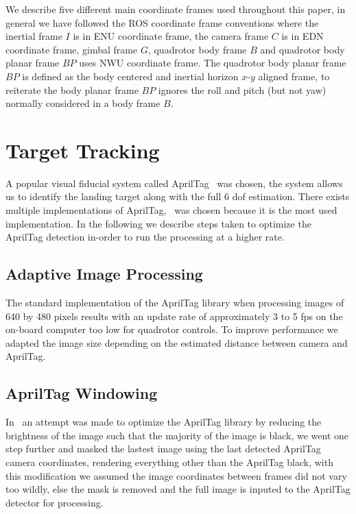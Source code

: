 \documentclass[letterpaper, 10 pt, conference]{ieeeconf}
\begin{document}
We describe five different main coordinate frames used throughout this
paper, in general we have followed the ROS coordinate frame conventions
where the inertial frame $I$ is in ENU coordinate frame, the camera frame
$C$ is in EDN coordinate frame, gimbal frame $G$, quadrotor body frame $B$ and
quadrotor body planar frame $BP$ uses NWU coordinate frame. The quadrotor body
planar frame $BP$ is defined as the body centered and inertial horizon $x$-$y$
aligned frame, to reiterate the body planar frame $BP$ ignores the roll and
pitch (but not yaw) normally considered in a body frame $B$.



\section{Target Tracking}
A popular visual fiducial system called AprilTag~\cite{Olson2011} was chosen,
the system allows us to identify the landing target along with the full 6 dof
estimation. There exists multiple implementations of
AprilTag,~\cite{AprilTagMIT} was chosen because it is the most used
implementation. In the following we describe steps taken to optimize the
AprilTag detection in-order to run the processing at a higher rate.


\subsection{Adaptive Image Processing}
The standard implementation of the AprilTag library when processing images
of 640 by 480 pixels results with an update rate of approximately 3 to
5 fps on the on-board computer too low for quadrotor controls. To improve
performance we adapted the image size depending on the estimated
distance between camera and AprilTag.

\subsection{AprilTag Windowing}
In~\cite{Ling2014} an attempt was made to optimize the AprilTag library
by reducing the brightness of the image such that the majority of the
image is black, we went one step further and masked the lastest image
using the last detected AprilTag camera coordinates, rendering everything
other than the AprilTag black, with this modification we assumed the image
coordinates between frames did not vary too wildly, else the mask is
removed and the full image is inputed to the AprilTag detector for
processing.
\end{document}
